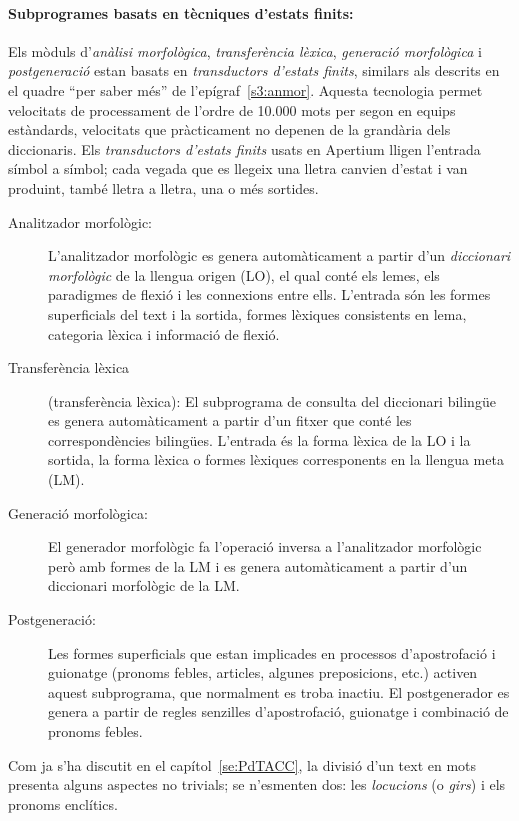 \paragraph{Subprogrames basats en tècniques d'estats finits:}
Els mòduls d'\emph{anàlisi morfològica}, \emph{transferència
  lèxica}, \emph{generació morfològica} i {\em postgeneració} estan
basats en \emph{transductors d'estats finits}, similars als descrits
en el quadre ``per saber més'' de l'epígraf~\ref{s3:anmor}. Aquesta
tecnologia permet velocitats de processament de l'ordre de 10.000 mots
per segon en equips estàndards, velocitats que pràcticament no depenen
de la grandària dels diccionaris. Els \emph{transductors d'estats
  finits} usats en Apertium lligen l'entrada símbol a
símbol; cada vegada que es llegeix una lletra canvien d'estat i van
produint, també lletra a lletra, una o més sortides.
\begin{description}
\item[Analitzador morfològic:] L'analitzador morfològic es genera
  automàticament a partir d'un \emph{diccionari morfològic} de la
  llengua origen (LO), el qual conté els lemes, els paradigmes de
  flexió i les connexions entre ells. L'entrada són les formes
  superficials del text i la sortida, formes lèxiques consistents en
  lema, categoria lèxica i informació de flexió.
 \item[Transferència lèxica] (transferència lèxica): El subprograma de
   consulta del diccionari bilingüe es genera automàticament a partir
   d'un fitxer que conté les correspondències bilingües. L'entrada és
   la forma lèxica de la LO i la sortida, la forma lèxica o formes
   lèxiques corresponents en la llengua meta (LM).
 \item[Generació morfològica:] El generador morfològic fa l'operació
   inversa a l'analitzador morfològic però amb formes de la LM i es
   genera automàticament a partir d'un diccionari morfològic de la LM.
 \item[Postgeneració:] Les formes superficials que estan implicades en
   processos d'apostrofació i guionatge (pronoms febles, articles,
   algunes preposicions, etc.) activen aquest subprograma, que
   normalment es troba inactiu. El postgenerador es genera a partir de
   regles senzilles d'apostrofació, guionatge i combinació de pronoms
   febles.
 \end{description}
 Com ja s'ha discutit en el capítol~\ref{se:PdTACC}, la divisió d'un
 text en mots presenta alguns aspectes no trivials; se n'esmenten dos:
 les \emph{locucions} (o \emph{girs}) i els pronoms enclítics.

